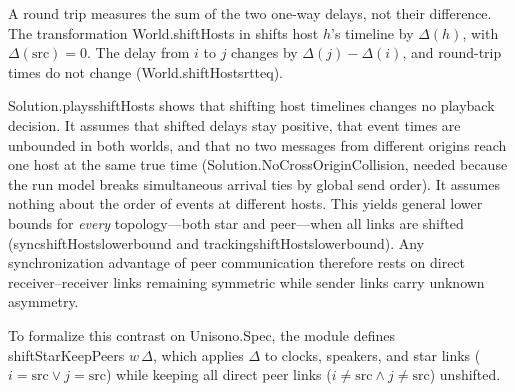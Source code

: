 \documentclass[11pt,a4paper]{article}
\DeclareRobustCommand{\lean}[1]{{\ttfamily\def\_{\textunderscore\allowbreak}#1}}
\theoremstyle{definition}
\begin{document}
A round trip measures the sum of the two one-way delays, not their difference.
The transformation \lean{World.shiftHosts} in  shifts
host $h$'s timeline by $\Delta(h)$, with $\Delta(\mathrm{src}) = 0$. The delay
from $i$ to $j$ changes by $\Delta(j) - \Delta(i)$, and round-trip times do not
change (\lean{World.shiftHosts\_rtt\_eq}).

\lean{Solution.plays\_shiftHosts} shows that shifting host timelines changes no
playback decision. It assumes that shifted delays stay positive, that event
times are unbounded in both worlds, and that no two messages from different
origins reach one host at the same true time
(\lean{Solution.NoCrossOriginCollision}, needed because the run model breaks
simultaneous arrival ties by global send order). It assumes nothing about the
order of events at different hosts. This yields general lower bounds for
\emph{every} topology—both star and peer—when all links are shifted
(\lean{sync\_shiftHosts\_lower\_bound} and
\lean{tracking\_shiftHosts\_lower\_bound}). Any synchronization advantage of
peer communication therefore rests on direct receiver--receiver links remaining
symmetric while sender links carry unknown asymmetry.

To formalize this contrast on \lean{Unisono.Spec}, the module
 defines
\lean{shiftStarKeepPeers} $w\,\Delta$, which applies $\Delta$ to clocks,
speakers, and star links ($i = \mathrm{src} \lor j = \mathrm{src}$) while
keeping all direct peer links ($i \ne \mathrm{src} \land j \ne \mathrm{src}$)
unshifted.
\end{document}
